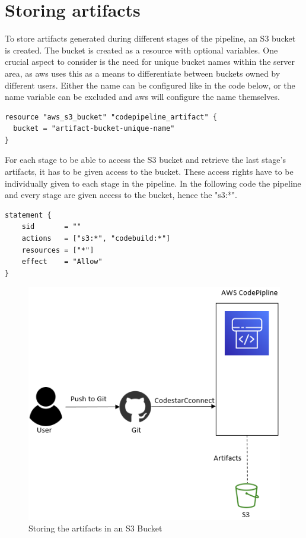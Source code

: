 \section{Storing artifacts}
To store \gls{artifact}s generated during different stages of the pipeline, an S3 bucket is created. The bucket is created as a resource with optional variables. One crucial aspect to consider is the need for unique bucket names within the server area, as \acrshort{aws} uses this as a means to differentiate between buckets owned by different users. Either the name can be configured like in the code below, or the name variable can be excluded and \acrshort{aws} will configure the name themselves.

\begin{tcolorbox}
\begin{verbatim}
resource "aws_s3_bucket" "codepipeline_artifact" {
  bucket = "artifact-bucket-unique-name"
}
\end{verbatim}
\end{tcolorbox}

For each stage to be able to access the S3 bucket and retrieve the last stage's \gls{artifact}s, it has to be given access to the bucket. These access rights have to be individually given to each stage in the pipeline. In the following code the pipeline and every stage are given access to the bucket, hence the "s3:*".

\begin{tcolorbox}
\begin{verbatim}
statement {
    sid       = ""
    actions   = ["s3:*", "codebuild:*"]
    resources = ["*"]
    effect    = "Allow"
}
\end{verbatim}
\end{tcolorbox}

\vspace{2mm}
\begin{figure}[H]
    \centering
    \includegraphics[width=0.6\columnwidth]{Images/aws-piplin-2.png}
    \caption{Storing the artifacts in an S3 Bucket}
    \label{fig: Storing the artifacts in an S3 Bucket}
\end{figure}

